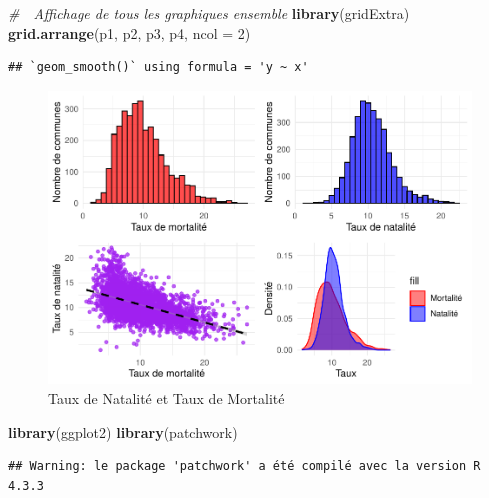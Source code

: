 \documentclass[
]{article}
\newenvironment{Shaded}{\begin{snugshade}}{\end{snugshade}}
\newcommand{\AttributeTok}[1]{\textcolor[rgb]{0.13,0.29,0.53}{#1}}
\newcommand{\CommentTok}[1]{\textcolor[rgb]{0.56,0.35,0.01}{\textit{#1}}}
\newcommand{\DecValTok}[1]{\textcolor[rgb]{0.00,0.00,0.81}{#1}}
\newcommand{\FunctionTok}[1]{\textcolor[rgb]{0.13,0.29,0.53}{\textbf{#1}}}
\newcommand{\NormalTok}[1]{#1}
\begin{document}
\begin{Shaded}
\begin{Highlighting}[]
\CommentTok{\# 📌 Affichage de tous les graphiques ensemble}
\FunctionTok{library}\NormalTok{(gridExtra)}
\FunctionTok{grid.arrange}\NormalTok{(p1, p2, p3, p4, }\AttributeTok{ncol =} \DecValTok{2}\NormalTok{)}
\end{Highlighting}
\end{Shaded}

\begin{verbatim}
## `geom_smooth()` using formula = 'y ~ x'
\end{verbatim}

\begin{figure}

{\centering \includegraphics{4_Analyse_Descriptive_files/figure-latex/unnamed-chunk-5-1} 

}

\caption{Taux de Natalité et Taux de Mortalité}\label{fig:unnamed-chunk-5}
\end{figure}

\begin{Shaded}
\begin{Highlighting}[]
\FunctionTok{library}\NormalTok{(ggplot2)}
\FunctionTok{library}\NormalTok{(patchwork)}
\end{Highlighting}
\end{Shaded}

\begin{verbatim}
## Warning: le package 'patchwork' a été compilé avec la version R 4.3.3
\end{verbatim}
\end{document}
